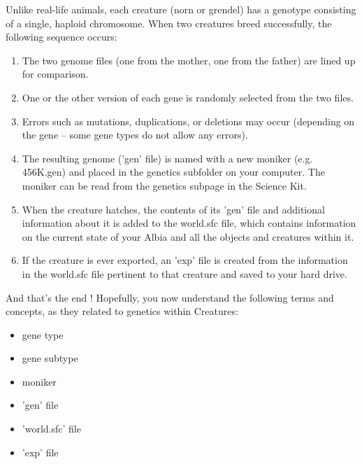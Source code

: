 \documentclass[11pt,twoside,a4paper]{article}
\begin{document}
Unlike real-life animals, each creature (norn or grendel) has a genotype consisting of a single, haploid chromosome. When two creatures breed successfully, the following sequence occurs:
\begin{enumerate}
	\setlength{\itemsep}{0pt}
	\setlength{\parskip}{0cm}
	\item The two genome files (one from the mother, one from the father) are lined up for comparison.
	\item One or the other version of each gene is randomly selected from the two files.
	\item Errors such as mutations, duplications, or deletions may occur (depending on the gene -- some gene types do not allow any errors).
	\item The resulting genome ('gen' file) is named with a new moniker (e.g. 456K.gen) and placed in the genetics subfolder on your computer. The moniker can be read from the genetics subpage in the Science Kit.
	\item When the creature hatches, the contents of its 'gen' file and additional information about it is added to the world.sfc file, which contains information on the current state of your Albia and all the objects and creatures within it.
	\item If the creature is ever exported, an 'exp' file is created from the information in the world.sfc file pertinent to that creature and saved to your hard drive.
\end{enumerate} %

And that's the end ! Hopefully, you now understand the following terms and concepts, as they related to genetics within Creatures:
\begin{itemize}
	\item gene type
	\item gene subtype
	\item moniker
	\item 'gen' file
	\item 'world.sfc' file
	\item 'exp' file 
\end{itemize} ~\\

\clearpage
\end{document}

